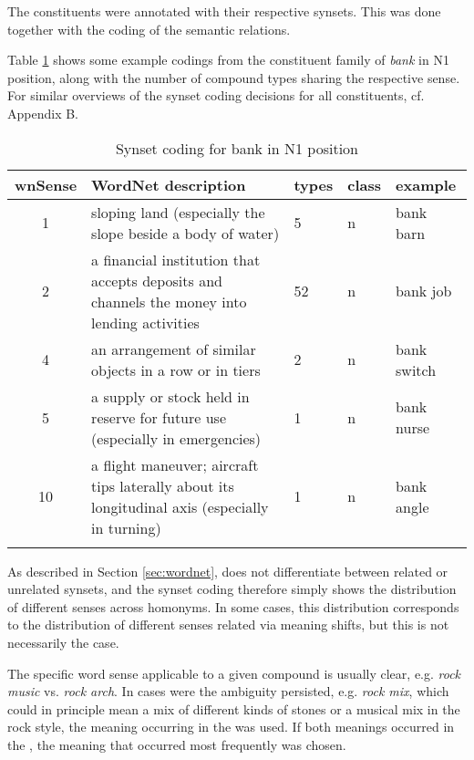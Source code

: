 The constituents were annotated with their respective 
synsets. This was done together with the coding of the semantic
relations. 

Table \ref{tab:bank-n1-synsets} shows some example codings from the constituent family of
\emph{bank} in N1 position, along with the number of compound types sharing the respective  sense. For similar overviews of the synset coding
decisions for all constituents, cf. Appendix B.%

\begin{table}[H]
\begin{tabularx}{\textwidth}{cp{5cm}lll}\lsptoprule
{\small wnSense}&WordNet description&types&class&example\\\midrule
1&sloping land (especially the slope beside a body of water)&5&n&bank barn\\\midrule
2&a financial institution that accepts deposits and channels the money into lending activities&52&n&bank job\\\midrule
4&an arrangement of similar objects in a row or in tiers&2&n&bank switch\\\midrule
5&a supply or stock held in reserve for future use (especially in emergencies)&1&n&bank nurse\\\midrule
10&a flight maneuver; aircraft tips laterally about its longitudinal axis (especially in turning)&1&n&bank angle\\\lspbottomrule
\end{tabularx}
  \caption{Synset coding for bank in N1 position}
  \label{tab:bank-n1-synsets}
\end{table}

As described in Section \ref{sec:wordnet},  does not differentiate
between related or unrelated synsets, and the synset coding therefore
simply shows the distribution of different senses across homonyms. In
some cases, this distribution corresponds to the distribution of different senses
related via meaning shifts, but this is not necessarily the case.

The specific word sense applicable to a given compound
is usually clear, e.g. \emph{rock music} vs. \emph{rock arch}. In
cases were the ambiguity persisted, e.g. \emph{rock mix}, which could in principle mean a mix of
different kinds of stones or a musical mix in the rock style, the
meaning occurring in the  was used. If both meanings occurred in
the , the meaning that occurred most frequently was chosen. 


